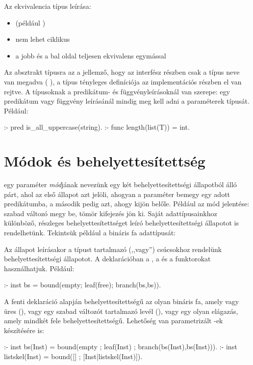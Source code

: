 Az ekvivalencia típus leírása:

\begin{itemize}
\item {}  \cd{==}  (például
)
\item nem lehet ciklikus
\item a jobb és a bal oldal teljesen ekvivalens egymással
\end{itemize}

Az absztrakt típusra az a jellemző, hogy az interfész részben csak a típus neve
van megadva ( ), a típus tényleges definíciója az
implementációs részben el van rejtve.
\br
A típusoknak a predikátum- és függvényleírásoknál van szerepe: egy predikátum
vagy függvény leírásánál mindig meg kell adni a paraméterek típusát. Például:

\begin{prologcode}
:- pred is_all_uppercase(string).
:- func length(list(T)) = int.
\end{prologcode}

\section{Módok és behelyettesítettség}

 egy paraméter \emph{mód}jának nevezünk egy két behelyettesítettségi állapotból
álló párt, ahol az első állapot azt jelöli, ahogyan a paraméter bemegy egy adott
predikátumba, a második pedig azt, ahogy kijön belőle. Például az  mód jelentése:
szabad változó megy be, tömör kifejezés jön ki.
\br
Saját adattípusainkhoz különböző, részleges behelyettesítettséget leíró behelyettesítettségi
állapotot is rendelhetünk. Tekintsük például a bináris fa adattípusát:


Az állapot leírásakor a típust tartalmazó (,,vagy'') csúcsokhoz rendelünk
behelyettesítettségi állapotot. A deklarációban a , a  és a
 funktorokat használhatjuk. Például:
\begin{prologcode}
:- inst bs = bound(empty; leaf(free); branch(bs,bs)).
\end{prologcode}
A fenti deklaráció alapján  behelyettesítettségű az olyan bináris fa, amely
vagy üres (), vagy egy szabad változót tartalmazó levél (),
vagy egy olyan elágazás, amely mindkét fele  behelyettesítettségű. Lehetőség
van parametrizált -ek készítésére is:
\begin{prologcode}
:- inst bs(Inst) = bound(empty ; leaf(Inst) ; branch(bs(Inst),bs(Inst))).
:- inst listskel(Inst) = bound([] ; [Inst|listskel(Inst)]).
\end{prologcode}

